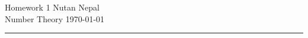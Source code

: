 

{\large
\noindent Homework 1\hfill
Nutan Nepal}\\
{\large
\noindent Number Theory \hfill \today}\\
\hrule
    
    \begin{questions}
        
        
        
        
        
         
    \end{questions}
    
